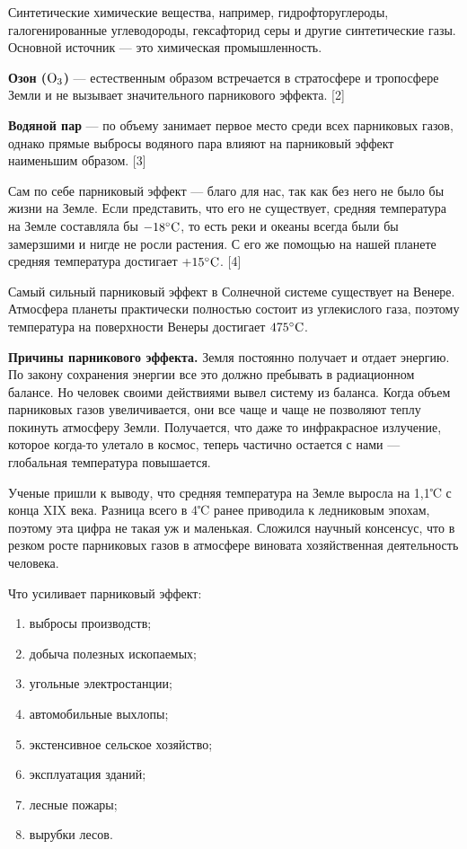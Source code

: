 Синтетические химические вещества, например, гидрофторуглероды, галогенированные углеводороды, гексафторид серы и другие синтетические газы. Основной источник — это химическая промышленность.

\textbf{Озон ($\rm{O}_3$)} — естественным образом встречается в стратосфере и тропосфере Земли и не вызывает значительного парникового эффекта. [2]

\textbf{Водяной пар} — по объему занимает первое место среди всех парниковых газов, однако прямые выбросы водяного пара влияют на парниковый эффект наименьшим образом. [3]

Сам по себе парниковый эффект — благо для нас, так как без него не было бы жизни на Земле. Если представить, что его не существует, средняя температура на Земле составляла бы $-18^\circ\rm{C}$, то есть реки и океаны всегда были бы замерзшими и нигде не росли растения. С его же помощью на нашей планете средняя температура достигает $+15^\circ\rm{C}$. [4]

Самый сильный парниковый эффект в Солнечной системе существует на Венере. Атмосфера планеты практически полностью состоит из углекислого газа, поэтому температура на поверхности Венеры достигает $475^\circ\rm{C}$.

\textbf{Причины парникового эффекта.}
Земля постоянно получает и отдает энергию. По закону сохранения энергии все это должно пребывать в радиационном балансе. Но человек своими действиями вывел систему из баланса. Когда объем парниковых газов увеличивается, они все чаще и чаще не позволяют теплу покинуть атмосферу Земли. Получается, что даже то инфракрасное излучение, которое когда-то улетало в космос, теперь частично остается с нами — глобальная температура повышается.

Ученые пришли к выводу, что средняя температура на Земле выросла на 1,1℃ с конца XIX века. Разница всего в 4℃ ранее приводила к ледниковым эпохам, поэтому эта цифра не такая уж и маленькая. Сложился научный консенсус, что в резком росте парниковых газов в атмосфере виновата хозяйственная деятельность человека.

Что усиливает парниковый эффект:
\begin{enumerate}
    \item выбросы производств;
    \item добыча полезных ископаемых;
    \item угольные электростанции;
    \item автомобильные выхлопы;
    \item экстенсивное сельское хозяйство;
    \item эксплуатация зданий;
    \item лесные пожары;
    \item вырубки лесов.
\end{enumerate}

